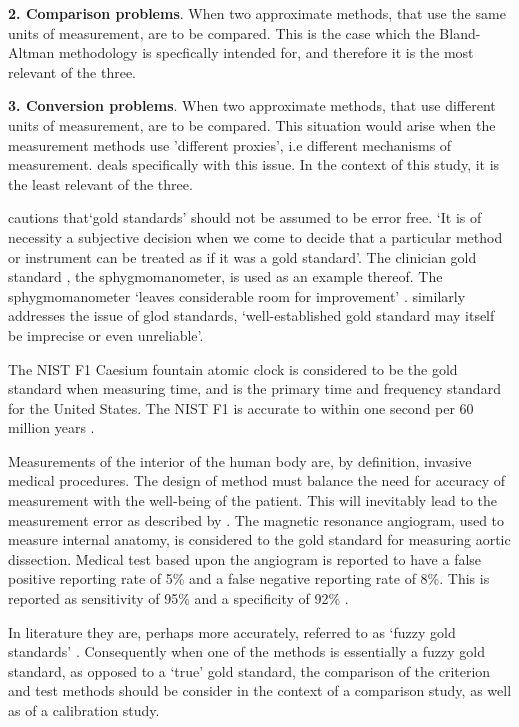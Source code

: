 \documentclass[12pt, a4paper]{report}
\theoremstyle{plain}
\theoremstyle{definition}
\theoremstyle{remark}
\begin{document}
\bigskip \textbf{2. Comparison problems}. When two approximate
methods, that use the same units of measurement, are to be
compared. This is the case which the Bland-Altman methodology is
specfically intended for, and therefore it is the most relevant of
the three.

\bigskip \textbf{3. Conversion problems}. When two approximate
methods, that use different units of measurement, are to be
compared. This situation would arise when the measurement methods
use 'different proxies', i.e different mechanisms of measurement.
\citet{lewis} deals specifically with this issue. In the context
of this study, it is the least relevant of the three.

\citet[p.47]{DunnSEME} cautions that`gold standards' should not be
assumed to be error free. `It is of necessity a subjective
decision when we come to decide that a particular method or
instrument can be treated as if it was a gold standard'. The
clinician gold standard , the sphygmomanometer, is used as an
example thereof.  The sphygmomanometer `leaves considerable room
for improvement' \citep{DunnSEME}. \citet{pizzi} similarly
addresses the issue of glod standards, `well-established gold
standard may itself be imprecise or even unreliable'.


The NIST F1 Caesium fountain atomic clock is considered to be the
gold standard when measuring time, and is the primary time and
frequency standard for the United States. The NIST F1 is accurate
to within one second per 60 million years \citep{NIST}.

Measurements of the interior of the human body are, by definition,
invasive medical procedures. The design of method must balance the
need for accuracy of measurement with the well-being of the
patient. This will inevitably lead to the measurement error as
described by \citet{DunnSEME}. The magnetic resonance angiogram,
used to measure internal anatomy,  is considered to the gold
standard for measuring aortic dissection. Medical test based upon
the angiogram is reported to have a false positive reporting rate
of 5\% and a false negative reporting rate of 8\%. This is
reported as sensitivity of 95\% and a specificity of 92\%
\citep{ACR}.

In literature they are, perhaps more accurately, referred to as
`fuzzy gold standards' \citep{phelps}. Consequently when one of the methods is
essentially a fuzzy gold standard, as opposed to a `true' gold
standard, the comparison of the criterion and test methods should
be consider in the context of a comparison study, as well as of a
calibration study.	
	
\end{document}
